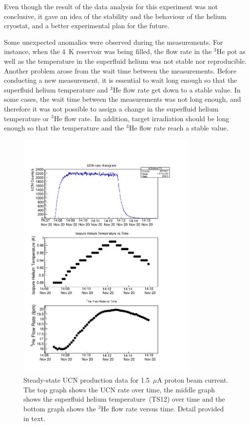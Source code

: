 Even though the result of the data analysis for this experiment was
not conclusive, it gave an idea of the stability and the behaviour of
the helium cryostat, and a better experimental plan for the future.

Some unexpected anomalies were observed during the measurements. For
instance, when the 4~K reservoir was being filled, the flow rate in
the $^3$He pot as well as the temperature in the superfluid helium was
not stable nor reproducible. Another problem arose from the wait time
between the measurements. Before conducting a new measurement, it is
essential to wait long enough so that the superfluid helium
temperature and $^3$He flow rate get down to a stable value. In some
cases, the wait time between the measurements was not long enough, and
therefore it was not possible to assign a change in the superfluid
helium temperature or $^3$He flow rate. In addition, target
irradiation should be long enough so that the temperature and the
$^3$He flow rate reach a stable value.

\begin{figure}[h!]
  \centering \includegraphics[width=0.8\textwidth]{problemrun.pdf}
  \caption[Steady-state UCN production data for 1.5~$\mu$A proton beam
  current]{Steady-state UCN production data for 1.5~$\mu$A proton beam
    current. The top graph shows the UCN rate over time, the middle
    graph shows the superfluid helium temperature~(TS12) over time and
    the bottom graph shows the $^3$He flow rate versus time. Detail
    provided in text.}
\label{fig:problemrun}
\end{figure}


